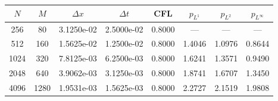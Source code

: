 \begin{tabular}{cccccccc}
\toprule
$N$ & $M$ & $\Delta x$ & $\Delta t$ & CFL & $p_{L^1}$ & $p_{L^2}$ & $p_{L^\infty}$ \\
\midrule
256 & 80 & 3.1250e-02 & 2.5000e-02 & 0.8000 & --- & --- & --- \\
512 & 160 & 1.5625e-02 & 1.2500e-02 & 0.8000 & 1.4046 & 1.0976 & 0.8644 \\
1024 & 320 & 7.8125e-03 & 6.2500e-03 & 0.8000 & 1.6241 & 1.3571 & 0.9490 \\
2048 & 640 & 3.9062e-03 & 3.1250e-03 & 0.8000 & 1.8741 & 1.6707 & 1.3450 \\
4096 & 1280 & 1.9531e-03 & 1.5625e-03 & 0.8000 & 2.2727 & 2.1519 & 1.9808 \\
\bottomrule
\end{tabular}